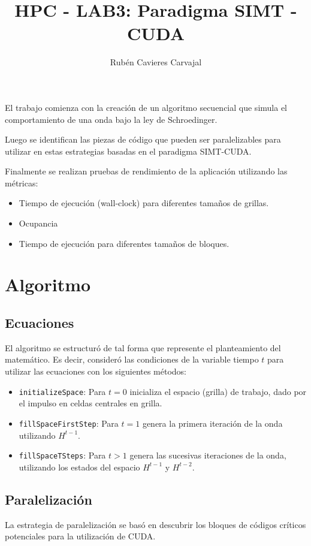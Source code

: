\documentclass[jou]{apa6}
\title{HPC - LAB3: Paradigma SIMT - CUDA}
\author{Rubén Cavieres Carvajal}
\affiliation{Universidad de Santiago de Chile}
\begin{document}
\maketitle
El trabajo comienza con la creación de un algoritmo secuencial que simula el comportamiento de una onda bajo la ley de Schroedinger.

Luego se identifican las piezas de código que pueden ser paralelizables para utilizar en estas estrategias basadas en el paradigma SIMT-CUDA.

Finalmente se realizan pruebas de rendimiento de la aplicación utilizando las métricas:

\begin{itemize}
	\item Tiempo de ejecución (wall-clock) para diferentes tamaños de grillas.
	\item Ocupancia
	\item Tiempo de ejecución para diferentes tamaños de bloques.
\end{itemize}


\section{Algoritmo}
\subsection{Ecuaciones}
El algoritmo se estructuró de tal forma que represente el planteamiento del matemático. Es decir, consideró las condiciones de la variable tiempo $t$ para utilizar las ecuaciones con los siguientes métodos:

\begin{itemize}
	\item \texttt{initializeSpace}: Para $t = 0$ inicializa el espacio (grilla) de trabajo, dado por el impulso en celdas centrales en grilla.
	\item \texttt{fillSpaceFirstStep}: Para $t = 1$ genera la primera iteración de la onda utilizando $H^{t-1}$.
	\item \texttt{fillSpaceTSteps}: Para $t > 1$ genera las sucesivas iteraciones de la onda, utilizando los estados del espacio $H^{t-1}$ y $H^{t-2}$.
\end{itemize}

\subsection{Paralelización}
La estrategia de paralelización se basó en descubrir los bloques de códigos críticos potenciales para la utilización de CUDA.
\end{document}
